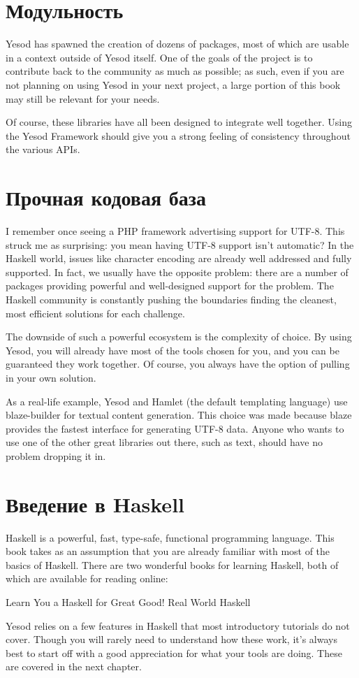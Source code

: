 \section{Модульность}

Yesod has spawned the creation of dozens of packages, most of which are usable in a context outside of Yesod itself. One of the goals of the project is to contribute back to the community as much as possible; as such, even if you are not planning on using Yesod in your next project, a large portion of this book may still be relevant for your needs.

Of course, these libraries have all been designed to integrate well together. Using the Yesod Framework should give you a strong feeling of consistency throughout the various APIs.

\section{Прочная кодовая база}

I remember once seeing a PHP framework advertising support for UTF-8. This struck me as surprising: you mean having UTF-8 support isn't automatic? In the Haskell world, issues like character encoding are already well addressed and fully supported. In fact, we usually have the opposite problem: there are a number of packages providing powerful and well-designed support for the problem. The Haskell community is constantly pushing the boundaries finding the cleanest, most efficient solutions for each challenge.

The downside of such a powerful ecosystem is the complexity of choice. By using Yesod, you will already have most of the tools chosen for you, and you can be guaranteed they work together. Of course, you always have the option of pulling in your own solution.

As a real-life example, Yesod and Hamlet (the default templating language) use blaze-builder for textual content generation. This choice was made because blaze provides the fastest interface for generating UTF-8 data. Anyone who wants to use one of the other great libraries out there, such as text, should have no problem dropping it in.

\section{Введение в Haskell}

Haskell is a powerful, fast, type-safe, functional programming language. This book takes as an assumption that you are already familiar with most of the basics of Haskell. There are two wonderful books for learning Haskell, both of which are available for reading online:

Learn You a Haskell for Great Good!
Real World Haskell

Yesod relies on a few features in Haskell that most introductory tutorials do not cover. Though you will rarely need to understand how these work, it's always best to start off with a good appreciation for what your tools are doing. These are covered in the next chapter.

